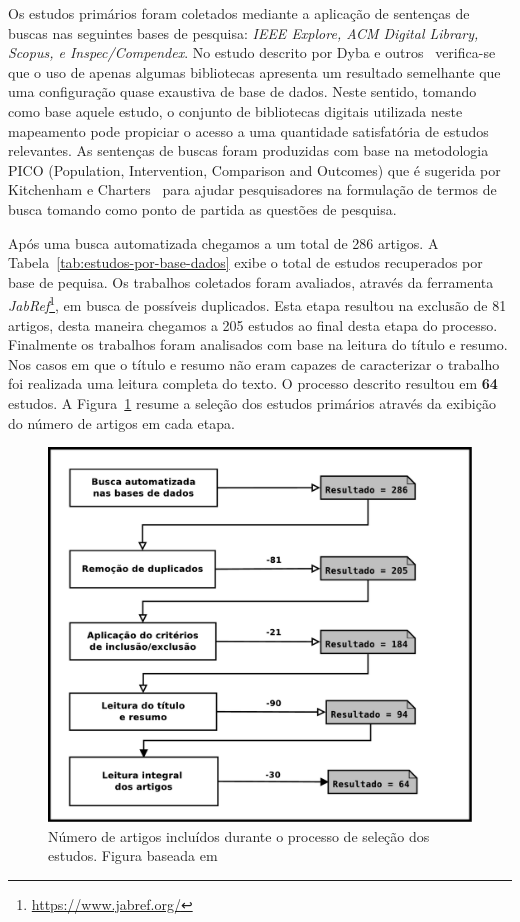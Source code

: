 Os estudos primários foram coletados mediante a aplicação de sentenças de buscas
nas seguintes bases de pesquisa: \textit{IEEE Explore, ACM Digital Library,
    Scopus, e Inspec/Compendex}. No estudo descrito por Dyba e
outros~\cite{dybaa2007applying} verifica-se que o uso de apenas algumas
bibliotecas apresenta um resultado semelhante que uma configuração quase
exaustiva de base de dados. Neste sentido, tomando como base aquele estudo, o
conjunto de bibliotecas digitais utilizada neste mapeamento pode propiciar o
acesso a uma quantidade satisfatória de estudos relevantes. As sentenças de
buscas foram produzidas com base na metodologia PICO (Population, Intervention,
Comparison and Outcomes) que é sugerida por Kitchenham e
Charters~\cite{keele2007guidelines} para ajudar pesquisadores na formulação de
termos de busca tomando como ponto de partida as questões de pesquisa.

Após uma busca automatizada chegamos a um total de 286 artigos. A
Tabela~\ref{tab:estudos-por-base-dados} exibe o total de estudos recuperados por
base de pequisa. Os trabalhos coletados foram avaliados, através da ferramenta
\textit{JabRef}\footnote{\url{https://www.jabref.org/}}, em busca de possíveis
duplicados. Esta etapa resultou na exclusão de 81 artigos, desta maneira
chegamos a 205 estudos ao final desta etapa do processo.  Finalmente os
trabalhos foram analisados com base na leitura do título e resumo.  Nos casos em
que o título e resumo não eram capazes de caracterizar o trabalho foi realizada
uma leitura completa do texto. O processo descrito resultou em \textbf{64}
estudos. A Figura~\ref{fig:diagrama-processo-selecao} resume a seleção dos
estudos primários através da exibição do número de artigos em cada etapa.

\begin{figure} \centering \includegraphics[width=0.75\linewidth]
	{./chapter-mapeamento-sistematico/img/diagrama-processo-selecao.pdf}
	\caption{Número de artigos incluídos durante o processo de seleção dos
		estudos. Figura baseada em~\cite{Petersen2015}}
\label{fig:diagrama-processo-selecao}
\end{figure}

